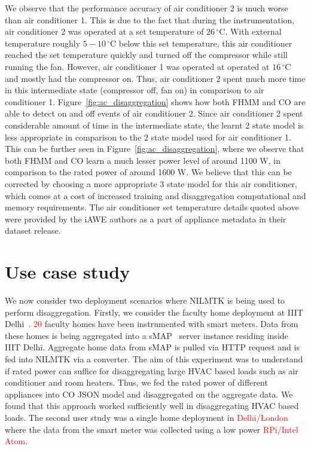 \documentclass{sig-alternate}
\newcommand{\redcolor}[1]{\textcolor{red}{#1}}
\newcommand{\figref}[1]{Figure~\ref{#1}}
\begin{document}
We observe that the performance accuracy of air conditioner 2 is much worse than air conditioner 1. This is due to the fact that during the instrumentation, air conditioner 2 was operated at a set temperature of $26\,^{\circ}\mathrm{C}$. With external temperature roughly $5-10\,^{\circ}\mathrm{C}$ below this set temperature, this air conditioner reached the set temperature quickly and turned off the compressor while still running the fan. However, air conditioner 1 was operated at operated at $16\,^{\circ}\mathrm{C}$ and mostly had the compressor on. Thus, air conditioner 2 spent much more time in this intermediate state (compressor off, fan on) in comparison to air conditioner 1. \figref{fig:ac_disaggregation} shows how both FHMM and CO are able to detect on and off events of air conditioner 2. Since air conditioner 2 spent considerable amount of time in the intermediate state, the learnt 2 state model is less appropriate in comparison to the 2 state model used for air conditioner 1. This can be further seen in \figref{fig:ac_disaggregation}, where we observe that both FHMM and CO learn a much lesser power level of around 1100 W, in comparison to the rated power of around 1600 W. We believe that this can be corrected by choosing a more appropriate 3 state model for this air conditioner, which comes at a cost of increased training and disaggregation computational and memory requirements. The air conditioner set temperature details quoted above were provided by the iAWE authors as a part of appliance metadata in their dataset release.




\section{Use case study}
We now consider two deployment scenarios where NILMTK is being used to perform disaggregation. Firstly, we consider the faculty home deployment at IIIT Delhi~\cite{batra_2012}. \redcolor{20} faculty homes have been instrumented with smart meters. Data from these homes is being aggregated into a sMAP~\cite{smap} server instance residing inside IIIT Delhi. Aggregate home data from sMAP is pulled via HTTP request and is fed into NILMTK via a converter. The aim of this experiment was to understand if rated power can suffice for disaggregating large HVAC based loads such as air conditioner and room heaters. Thus, we fed the rated power of different appliances into CO JSON model and disaggregated on the aggregate data. We found that this approach worked sufficiently well in disaggregating HVAC based loads. The second user study was a single home deployment in \redcolor{Delhi/London} where the data from the smart meter was collected using a low power \redcolor{RPi/Intel Atom}.
\end{document}
